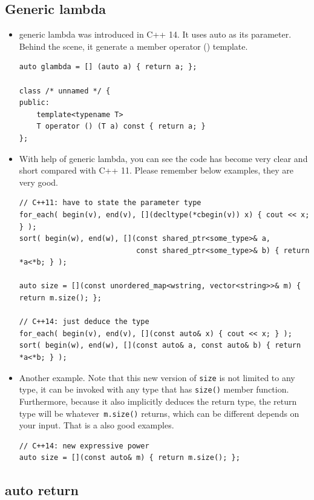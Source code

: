 \documentclass[a4paper,11pt,twoside]{book}
\begin{document}
\subsection{Generic lambda}
	
\begin{itemize}
		\item generic lambda was introduced in C++ 14. It uses auto as its parameter. Behind the scene, it generate a member operator () template. 
\begin{lstlisting}
auto glambda = [] (auto a) { return a; };

class /* unnamed */ {
public:
    template<typename T>
    T operator () (T a) const { return a; }
};
\end{lstlisting}

		\item With help of generic lambda, you can see the code has become very clear and short compared with C++ 11. Please remember below examples, they are very good.

\begin{lstlisting}
// C++11: have to state the parameter type
for_each( begin(v), end(v), [](decltype(*cbegin(v)) x) { cout << x; } );
sort( begin(w), end(w), [](const shared_ptr<some_type>& a, 
                           const shared_ptr<some_type>& b) { return *a<*b; } );

auto size = [](const unordered_map<wstring, vector<string>>& m) { return m.size(); };

// C++14: just deduce the type
for_each( begin(v), end(v), [](const auto& x) { cout << x; } );
sort( begin(w), end(w), [](const auto& a, const auto& b) { return *a<*b; } );
\end{lstlisting}

		\item Another example.  Note that this new version of \texttt{size} is not limited to any type, it can be invoked with any type that has \texttt{size()} member function. Furthermore, because it also implicitly deduces the return type, the return type will be whatever\texttt{ m.size()} returns, which can be different depends on your input. That is a also good examples.

\begin{lstlisting}
// C++14: new expressive power
auto size = [](const auto& m) { return m.size(); };
\end{lstlisting}

\end{itemize}

\subsection{auto return}
\end{document}
